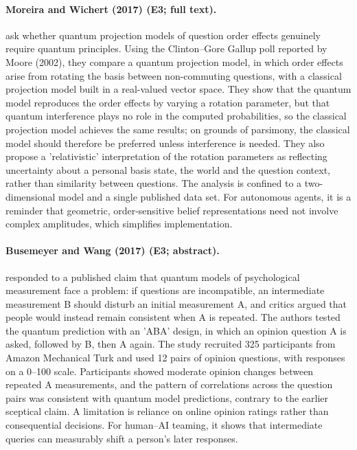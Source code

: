 \documentclass[10pt,a4paper]{article}
\begin{document}
\paragraph{Moreira and Wichert (2017) (E3; full text).} \citet{Moreira2017b} ask whether quantum projection models of question order effects genuinely require quantum principles. Using the Clinton--Gore Gallup poll reported by Moore (2002), they compare a quantum projection model, in which order effects arise from rotating the basis between non-commuting questions, with a classical projection model built in a real-valued vector space. They show that the quantum model reproduces the order effects by varying a rotation parameter, but that quantum interference plays no role in the computed probabilities, so the classical projection model achieves the same results; on grounds of parsimony, the classical model should therefore be preferred unless interference is needed. They also propose a 'relativistic' interpretation of the rotation parameters as reflecting uncertainty about a personal basis state, the world and the question context, rather than similarity between questions. The analysis is confined to a two-dimensional model and a single published data set. For autonomous agents, it is a reminder that geometric, order-sensitive belief representations need not involve complex amplitudes, which simplifies implementation.

\paragraph{Busemeyer and Wang (2017) (E3; abstract).} \citet{Busemeyer2017b} responded to a published claim that quantum models of psychological measurement face a problem: if questions are incompatible, an intermediate measurement B should disturb an initial measurement A, and critics argued that people would instead remain consistent when A is repeated. The authors tested the quantum prediction with an 'ABA' design, in which an opinion question A is asked, followed by B, then A again. The study recruited 325 participants from Amazon Mechanical Turk and used 12 pairs of opinion questions, with responses on a 0--100 scale. Participants showed moderate opinion changes between repeated A measurements, and the pattern of correlations across the question pairs was consistent with quantum model predictions, contrary to the earlier sceptical claim. A limitation is reliance on online opinion ratings rather than consequential decisions. For human--AI teaming, it shows that intermediate queries can measurably shift a person's later responses.
\end{document}
